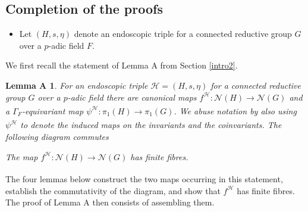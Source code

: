 \documentclass[11pt,a4paper]{article}
\theoremstyle{definition}
\theoremstyle{plain}
\theoremstyle{remark}
\theoremstyle{plain}
\newtheorem*{LemA}{Lemma A}
\begin{document}
\subsection{Completion of the proofs}
\begin{itemize}
    \item Let $(H,s,\eta)$ denote an endoscopic triple for a connected reductive group $G$ over a $p$-adic field $F$.
\end{itemize}

We first recall the statement of Lemma A from Section \ref{intro2}.

\begin{LemA}
For an endoscopic triple $\mathcal{H} =(H,s,\eta)$ for a connected reductive group $G$ over a $p$-adic field there are canonical maps $f^{\mathcal{H}}: \mathcal{N}(H) \xrightarrow[]{} \mathcal{N}(G)$ and a $\Gamma_F$-equivariant map $\psi^{\mathcal{H}}: \pi_1(H) \xrightarrow[]{} \pi_1(G)$. We abuse notation by also using $\psi^{\mathcal{H}}$ to denote the induced maps on the invariants and the coinvariants. The following diagram commutes
\begin{center}
\end{center}

The map $f^{\mathcal{H}}:\mathcal{N}(H) \xrightarrow[]{} \mathcal{N}(G)$ has finite fibres.
\end{LemA}

The four lemmas below construct the two maps occurring in this statement, establish the commutativity of the diagram, and show that $f^{\mathcal H}$ has finite fibres. The proof of Lemma A then consists of assembling them.
\end{document}
